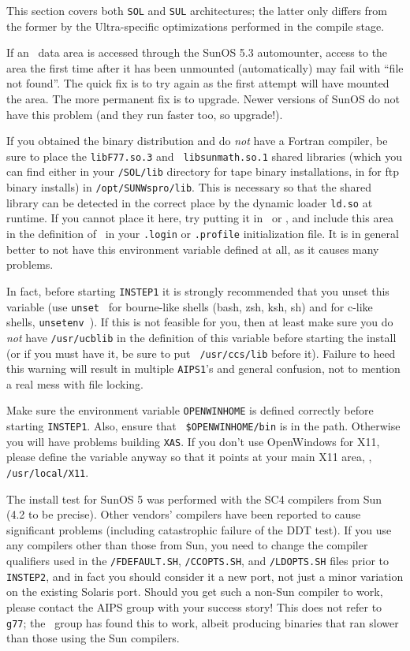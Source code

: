 \medskip{}

This section covers both {\tt SOL} and {\tt SUL} architectures; the
latter only differs from the former by the Ultra-specific optimizations
performed in the compile stage.

If an \AIPS\ data area is accessed through the SunOS 5.3 automounter,
access to the area the first time after it has been unmounted
(automatically) may fail with ``file not found''.  The quick fix is to
try again as the first attempt will have mounted the area.  The more
permanent fix is to upgrade.  Newer versions of SunOS do not have this
problem (and they run faster too, so upgrade!).

If you obtained the binary distribution and do {\it not\/} have a
Fortran compiler, be sure to place the {\tt libF77.so.3} and {\tt
libsunmath.so.1} shared libraries (which you can find either in your
{\tt\AROOT/SOL/lib} directory for tape binary installations, in
{\tt\AROOT} for ftp binary installs) in {\tt /opt/SUNWspro/lib}.  This
is necessary so that the shared library can be detected in the correct
place by the dynamic loader {\tt ld.so} at runtime.  If you cannot place
it here, try putting it in \SYSL\ or \AROOT, and include this area in
the definition of \LDLIB\ in your {\tt .login} or {\tt .profile}
initialization file.  It is in general better to not have this
environment variable defined at all, as it causes many problems.

In fact, before starting {\tt INSTEP1} it is strongly recommended that
you unset this variable (use {\tt unset \LDLIB} for bourne-like shells
(bash, zsh, ksh, sh) and for c-like shells, {\tt unsetenv \LDLIB}).  If
this is not feasible for you, then at least make sure you do {\it not\/}
have {\tt /usr/ucblib} in the definition of this variable before
starting the install (or if you must have it, be sure to put {\tt
/usr/ccs/lib} before it).  Failure to heed this warning will result in
multiple {\tt AIPS1}'s and general confusion, not to mention a real mess
with file locking.

Make sure the environment variable {\tt OPENWINHOME} is defined
correctly before starting {\tt INSTEP1}.  Also, ensure that {\tt
\$OPENWINHOME/bin}
is in the path.  Otherwise you will have problems building {\tt XAS}.
If you don't use OpenWindows for X11, please define the variable anyway
so that it points at your main X11 area, \eg, {\tt /usr/local/X11}.

The install test for SunOS 5 was performed with the SC4 compilers from
Sun (4.2 to be precise).  Other vendors' compilers have been reported to
cause significant problems (including catastrophic failure of the DDT
test).  If you use any compilers other than those from Sun, you need to
change the compiler qualifiers used in the {\tt \SYSU/FDEFAULT.SH},
{\tt\SYSL/CCOPTS.SH}, and {\tt\SYSL/LDOPTS.SH} files prior to {\tt
INSTEP2}, and in fact you should consider it a new port, not just a
minor variation on the existing Solaris port.  Should you get such a
non-Sun compiler to work, please contact the AIPS group with your
success story!  This does not refer to {\tt g77}; the \AIPS\ group has
found this to work, albeit producing binaries that ran slower than those
using the Sun compilers.

